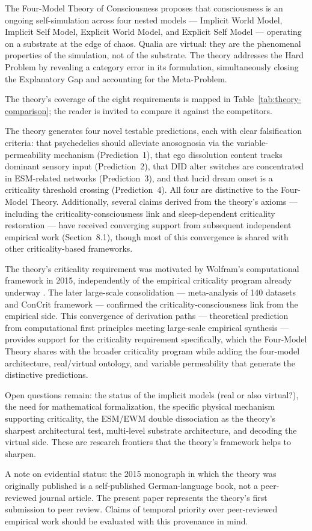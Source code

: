 \documentclass[12pt]{article}
\newcommand{\revstart}{}
\newcommand{\revend}{}
\begin{document}
The Four-Model Theory of Consciousness proposes that consciousness is an ongoing self-simulation across four nested models --- Implicit World Model, Implicit Self Model, Explicit World Model, and Explicit Self Model --- operating on a substrate at the edge of chaos. Qualia are virtual: they are the phenomenal properties of the simulation, not of the substrate. The theory addresses the Hard Problem by revealing a category error in its formulation, simultaneously closing the Explanatory Gap and accounting for the Meta-Problem.

{\revstart The theory's coverage of the eight requirements is mapped in Table~\ref{tab:theory-comparison}; the reader is invited to compare it against the competitors.

The theory generates four novel testable predictions, each with clear falsification criteria: that psychedelics should alleviate anosognosia via the variable-permeability mechanism (Prediction~1), that ego dissolution content tracks dominant sensory input (Prediction~2), that DID alter switches are concentrated in ESM-related networks (Prediction~3), and that lucid dream onset is a criticality threshold crossing (Prediction~4). All four are distinctive to the Four-Model Theory. Additionally, several claims derived from the theory's axioms --- including the criticality-consciousness link and sleep-dependent criticality restoration --- have received converging support from subsequent independent empirical work (Section~8.1), though most of this convergence is shared with other criticality-based frameworks.

The theory's criticality requirement was motivated by Wolfram's computational framework in 2015, independently of the empirical criticality program already underway \citep{Beggs2003,CarhartHarris2014}. The later large-scale consolidation --- \citet{HengenShew2025} meta-analysis of 140 datasets and \citet{AlgomShriki2026} ConCrit framework --- confirmed the criticality-consciousness link from the empirical side. This convergence of derivation paths --- theoretical prediction from computational first principles meeting large-scale empirical synthesis --- provides support for the criticality requirement specifically, which the Four-Model Theory shares with the broader criticality program while adding the four-model architecture, real/virtual ontology, and variable permeability that generate the distinctive predictions.

Open questions remain: the status of the implicit models (real or also virtual?), the need for mathematical formalization, the specific physical mechanism supporting criticality, the ESM/EWM double dissociation as the theory's sharpest architectural test, multi-level substrate architecture, and decoding the virtual side. These are research frontiers that the theory's framework helps to sharpen.

A note on evidential status: the 2015 monograph \citep{Gruber2015} in which the theory was originally published is a self-published German-language book, not a peer-reviewed journal article. The present paper represents the theory's first submission to peer review. Claims of temporal priority over peer-reviewed empirical work should be evaluated with this provenance in mind.\revend}
\end{document}

